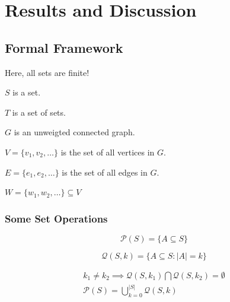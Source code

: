
\def\Ccal{\mathcal{C}}
\def\Ecal{\mathcal{E}}
\def\Fcal{\mathcal{F}}
\def\Hcal{\mathcal{H}}
\def\Lcal{\mathcal{L}}
\def\Pcal{\mathcal{P}}
\def\Qcal{\mathcal{Q}}
\def\xcal{\mathcal{x}}
\newcommand{\resolving}[1]{\Psi^{}_{#1}}
\newcommand{\nonresolving}[1]{\widetilde{\resolving{#1}}}
\def\bool{\mathtt{Bool}}
\def\int{\mathtt{Int}}
\def\sat{\texttt{sat}}
\def\unsat{\texttt{unsat}}

\setcounter{chapter}{4}
\setcounter{section}{1}

\setcounter{chapter}{3}
\chapter{Results and Discussion}

\section{Formal Framework}

Here, all sets are finite!

\(S\) is a set.

\(T\) is a set of sets.

\(G\) is an unweigted connected graph.

\(V = \{v_1, v_2, \ldots\}\) is the set of all vertices in \(G\).

\(E = \{e_1, e_2, \ldots\}\) is the set of all edges in \(G\).

\(W = \{w_1, w_2, \ldots\} \subseteq V \)

\subsection{Some Set Operations}

\begin{definition}
	\[ \Pcal(S)   = \{A \subseteq S\} \]
\end{definition}

\begin{definition}
	\[ \Qcal(S,k) = \{A \subseteq S : |A| = k\} \]
\end{definition}

\begin{corollary}
	\[\begin{array}{c}
		k_1 \neq k_2 \implies \Qcal(S,k_1) \bigcap \Qcal(S,k_2) = \emptyset \\ [8pt]
		\Pcal(S) = \displaystyle \bigcup \limits_{k = 0}^{|S|} \Qcal(S,k)
	\end{array}\]
\end{corollary}

